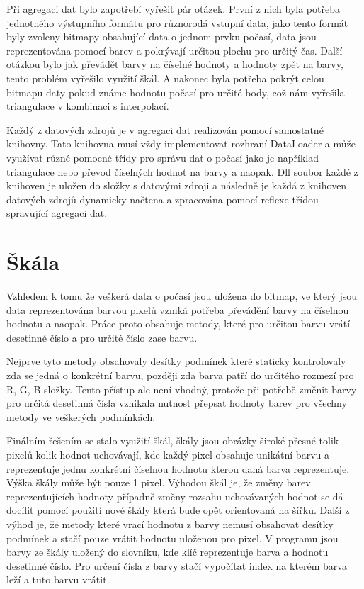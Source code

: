 \documentclass[czech,bachelor,dept460,male,csharp,cpdeclaration]{diploma}
\begin{document}
	Při agregaci dat bylo zapotřebí vyřešit pár otázek. První z nich byla potřeba jednotného výstupního formátu pro různorodá vstupní data, jako tento formát byly zvoleny bitmapy obsahující data o jednom prvku počasí, data jsou reprezentována pomocí barev a pokrývají určitou plochu pro určitý čas. Další otázkou bylo jak převádět barvy na číselné hodnoty a hodnoty zpět na barvy, tento problém vyřešilo využití škál. A nakonec byla potřeba pokrýt celou bitmapu daty pokud známe hodnotu počasí pro určité body, což nám vyřešila triangulace v kombinaci s interpolací.
	
	Každý z datových zdrojů je v agregaci dat realizován pomocí samostatné knihovny. Tato knihovna musí vždy implementovat rozhraní DataLoader a může využívat různé pomocné třídy pro správu dat o počasí jako je například triangulace nebo převod číselných hodnot na barvy a naopak. Dll soubor každé z knihoven je uložen do složky s datovými zdroji a následně je každá z knihoven datových zdrojů dynamicky načtena a zpracována pomocí reflexe třídou spravující agregaci dat.
	
	\section{Škála}
	
	Vzhledem k tomu že veškerá data o počasí jsou uložena do bitmap, ve který jsou data reprezentována barvou pixelů vzniká potřeba převádění barvy na číselnou hodnotu a naopak. Práce proto obsahuje metody, které pro určitou barvu vrátí desetinné číslo a pro určité číslo zase barvu.
	
	Nejprve tyto metody obsahovaly desítky podmínek které staticky kontrolovaly zda se jedná o konkrétní barvu, později zda barva patří do určitého rozmezí pro R, G, B složky. Tento přístup ale není vhodný, protože při potřebě změnit barvy pro určitá desetinná čísla vznikala nutnost přepsat hodnoty barev pro všechny metody ve veškerých podmínkách.
	
	Finálním řešením se stalo využití škál, škály jsou obrázky široké přesné tolik pixelů kolik hodnot uchovávají, kde každý pixel obsahuje unikátní barvu a reprezentuje jednu konkrétní číselnou hodnotu kterou daná barva reprezentuje. Výška škály může být pouze 1 pixel. Výhodou škál je, že změny barev reprezentujících hodnoty případně změny rozsahu uchovávaných hodnot se dá docílit pomocí použití nové škály která bude opět orientovaná na šířku. Další z výhod je, že metody které vrací hodnotu z barvy nemusí obsahovat desítky podmínek a stačí pouze vrátit hodnotu uloženou pro pixel. V programu jsou barvy ze škály uložený do slovníku, kde klíč reprezentuje barva a hodnotu desetinné číslo. Pro určení čísla z barvy stačí vypočítat index na kterém barva leží a tuto barvu vrátit.
	
\end{document}

